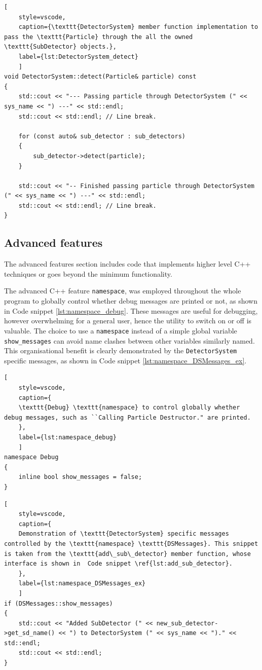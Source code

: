 \documentclass{article}
\begin{document}
\begin{lstlisting}[
    style=vscode, 
    caption={\texttt{DetectorSystem} member function implementation to pass the \texttt{Particle} through the all the owned \texttt{SubDetector} objects.},
    label={lst:DetectorSystem_detect}
    ]
void DetectorSystem::detect(Particle& particle) const
{
    std::cout << "--- Passing particle through DetectorSystem (" << sys_name << ") ---" << std::endl;
    std::cout << std::endl; // Line break.

    for (const auto& sub_detector : sub_detectors)
    {
        sub_detector->detect(particle);
    }

    std::cout << "-- Finished passing particle through DetectorSystem (" << sys_name << ") ---" << std::endl;
    std::cout << std::endl; // Line break.
}
\end{lstlisting}

\subsection{Advanced features}

The advanced features section includes code that implements higher level C++ techniques or goes beyond the minimum functionality.

The advanced C++ feature \texttt{namespace}, was employed throughout the whole program to globally control whether debug messages are printed or not, as shown in Code snippet \ref{lst:namespace_debug}.
These messages are useful for debugging, however overwhelming for a general user, hence the utility to switch on or off is valuable.
The choice to use a \texttt{namespace} instead of a simple global variable \texttt{show\_messages} can avoid name clashes between other variables similarly named.
This organisational benefit is clearly demonstrated by the \texttt{DetectorSystem} specific messages, as shown in Code snippet \ref{lst:namespace_DSMessages_ex}.

\begin{lstlisting}[
    style=vscode, 
    caption={
    \texttt{Debug} \texttt{namespace} to control globally whether debug messages, such as ``Calling Particle Destructor." are printed.
    },
    label={lst:namespace_debug}
    ]
namespace Debug
{
    inline bool show_messages = false;
}
\end{lstlisting}

\begin{lstlisting}[
    style=vscode, 
    caption={
    Demonstration of \texttt{DetectorSystem} specific messages controlled by the \texttt{namespace} \texttt{DSMessages}. This snippet is taken from the \texttt{add\_sub\_detector} member function, whose interface is shown in  Code snippet \ref{lst:add_sub_detector}.
    },
    label={lst:namespace_DSMessages_ex}
    ]
if (DSMessages::show_messages)
{
    std::cout << "Added SubDetector (" << new_sub_detector->get_sd_name() << ") to DetectorSystem (" << sys_name << ")." << std::endl;
    std::cout << std::endl;
}
\end{lstlisting}
\end{document}
